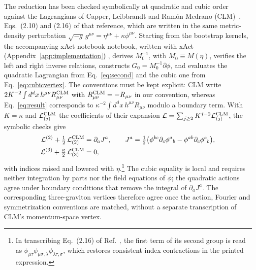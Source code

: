 \documentclass[prd,aps,preprint,superscriptaddress,nofootinbib,amsmath,amssymb,eqsecnum]{revtex4-2}
\providecommand{\DIFaddtex}[1]{{\protect\color{blue} \sf #1}} %
\providecommand{\DIFdeltex}[1]{{\protect\color{red} \scriptsize #1}} %
\providecommand{\DIFaddbegin}{} %
\providecommand{\DIFaddend}{} %
\providecommand{\DIFdelbegin}{} %
\providecommand{\DIFdelend}{} %
\providecommand{\DIFadd}[1]{\texorpdfstring{\DIFaddtex{#1}}{#1}} %
\providecommand{\DIFdel}[1]{\texorpdfstring{\DIFdeltex{#1}}{}} %
\begin{document}
The reduction has been checked symbolically at quadratic and cubic order against the
Lagrangians of Capper, Leibbrandt and Ram\'on Medrano (CLM)~\cite{CLM1973}, Eqs.~(2.10) and
(2.16) of that reference, which are written in the same metric-density perturbation
$\sqrt{-g}\,g^{\mu\nu}=\eta^{\mu\nu}+\kappa\phi^{\mu\nu}$. Starting from the bootstrap
kernels, the accompanying \DIFdelbegin \DIFdel{xAct notebook}\DIFdelend \DIFaddbegin \DIFadd{notebook, written with xAct~\cite{xAct,xPerm,xTras}
}\DIFaddend (Appendix~\ref{app:implementation})\DIFaddbegin \DIFadd{, }\DIFaddend derives
$M_0^{-1}$, with $M_0\equiv M(\eta)$, verifies the left and right inverse relations,
constructs $G_0=M_0^{-1}\partial\phi$, and evaluates the quadratic Lagrangian from
Eq.~\eqref{eq:second} and the cubic one from Eq.~\eqref{eq:cubicvertex}. The conventions
must be kept explicit: CLM write $2K^{-2}\int d^dx\,h^{\mu\nu}R^{\rm CLM}_{\mu\nu}$ with
$R^{\rm CLM}_{\mu\nu}=-R_{\mu\nu}$ in our convention, whereas Eq.~\eqref{eq:result}
corresponds to $\kappa^{-2}\int d^dx\,h^{\mu\nu}R_{\mu\nu}$ modulo a boundary term. With
$K=\kappa$ and $\mathcal L^{\rm CLM}_{(j)}$ the coefficients of their expansion
$\mathcal L=\sum_{j\ge2}K^{j-2}\mathcal L^{\rm CLM}_{(j)}$, the symbolic checks give
\begin{align}
\mathcal L^{(2)}+\tfrac12\,\mathcal L^{\rm CLM}_{(2)}&=\partial_aJ^a,\qquad
J^a=\tfrac12\big(\phi^{bc}\partial_c\phi^{a}{}_{b}-\phi^{ab}\partial_c\phi^{c}{}_{b}\big),
\label{eq:clm-quadratic}\\
\mathcal L^{(3)}+\tfrac{\kappa}{2}\,\mathcal L^{\rm CLM}_{(3)}&=0,
\label{eq:clm-cubic}
\end{align}
with indices raised and lowered with $\eta$.\footnote{In transcribing Eq.~(2.16) of
Ref.~\cite{CLM1973}, the first term of its second group is read as
$\phi_{\mu\tau}\phi_{\mu\sigma,\lambda}\phi_{\lambda\tau,\sigma}$, which restores consistent
index contractions in the printed expression.} The cubic equality is local and requires
neither integration by parts nor the field equations of $\phi$; the quadratic actions agree
under boundary conditions that remove the integral of $\partial_aJ^a$. The corresponding
three-graviton vertices therefore agree once the action, Fourier and symmetrization
conventions are matched, without a separate transcription of CLM's momentum-space vertex.
\end{document}
